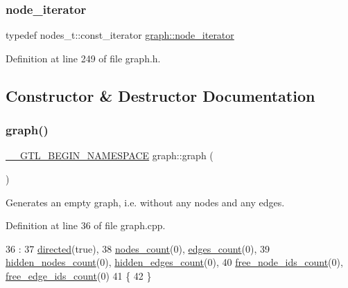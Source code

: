 \subsubsection{\texorpdfstring{node\+\_\+iterator}{node\_iterator}}
{\footnotesize\ttfamily typedef nodes\+\_\+t\+::const\+\_\+iterator \mbox{\hyperlink{classgraph_a2cb374b84c133ce13f94e73c3e5da7fa}{graph\+::node\+\_\+iterator}}}



Definition at line 249 of file graph.\+h.



\subsection{Constructor \& Destructor Documentation}
\mbox{\label{classgraph_a5a16b3cd1bfb376b0ec6be2ee2ea6ab1}} 
\subsubsection{\texorpdfstring{graph()}{graph()}\hspace{0.1cm}{\footnotesize\ttfamily [1/4]}}
{\footnotesize\ttfamily \mbox{\hyperlink{_g_t_l_8h_a2d9f24096ac60918452dd51f32b64aa9}{\+\_\+\+\_\+\+G\+T\+L\+\_\+\+B\+E\+G\+I\+N\+\_\+\+N\+A\+M\+E\+S\+P\+A\+CE}} graph\+::graph (\begin{DoxyParamCaption}{ }\end{DoxyParamCaption})}

Generates an empty graph, i.\+e. without any nodes and any edges. 

Definition at line 36 of file graph.\+cpp.


\begin{DoxyCode}
36              :
37     \mbox{\hyperlink{classgraph_ab4120df210eb3d03d20b0bd27f8cbe8c}{directed}}(\textcolor{keyword}{true}),
38     \mbox{\hyperlink{classgraph_a1f59223d0bcf647920963d7a661dd74a}{nodes\_count}}(0), \mbox{\hyperlink{classgraph_af560ff4263ad165c166a46084e781b4a}{edges\_count}}(0),
39     \mbox{\hyperlink{classgraph_aa72548d972d226a69f7f8fb92b363860}{hidden\_nodes\_count}}(0), \mbox{\hyperlink{classgraph_a3151f544e049fbd985204ca9d8f74c97}{hidden\_edges\_count}}(0),
40     \mbox{\hyperlink{classgraph_a9480e2310fe64c3a8ad295bb3f119772}{free\_node\_ids\_count}}(0), \mbox{\hyperlink{classgraph_a336be547b5e0ca43b96cf00131e0e1da}{free\_edge\_ids\_count}}(0)
41 \{
42 \}
\end{DoxyCode}
\mbox{\label{classgraph_a4339b04667a9977110e59a1326b0e2d5}} 
